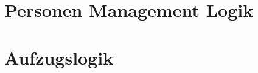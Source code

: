 \documentclass[envcountsame, envcountchap, deutsch]{i-studis}
\begin{document}
\hypertarget{personen-management-logik}{%
\chapter{Personen Management Logik}\label{personen-management-logik}}

\hypertarget{aufzugslogik}{%
\chapter{Aufzugslogik}\label{aufzugslogik}}




\end{document}
